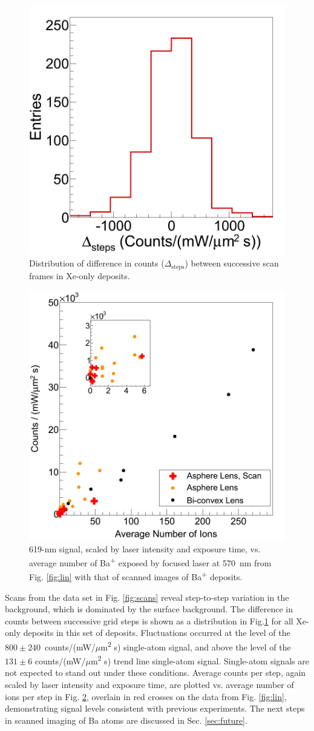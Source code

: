 \begin{figure} %
        \centering
                \includegraphics[width=.35\textwidth]{figures/scans_dframeXe.png}
                \caption{Distribution of difference in counts ($\Delta_{\text{steps}}$) between successive scan frames in Xe-only deposits.}
\label{fig:scanVarXe}
\end{figure}

\begin{figure} %
        \centering
                \includegraphics[width=.45\textwidth]{figures/lin_withScan_lin.png}
                \caption{619-nm signal, scaled by laser intensity and exposure time, vs. average number of Ba\textsuperscript{+} exposed by focused laser at 570~nm from Fig. \ref{fig:lin} with that of scanned images of Ba\textsuperscript{+} deposits.}
\label{fig:linScan}
\end{figure}

Scans from the data set in Fig. \ref{fig:scans} reveal step-to-step variation in the background, which is dominated by the surface background.  The difference in counts between successive grid steps is shown as a distribution in Fig.\ref{fig:scanVarXe} for all Xe-only deposits in this set of deposits.  Fluctuations occurred at the level of the $800 \pm 240$~counts/(mW/$\mu$m\textsuperscript{2} s) single-atom signal, and above the level of the $131 \pm 6$ counts/(mW/$\mu$m\textsuperscript{2} s) trend line single-atom signal.  Single-atom signals are not expected to stand out under these conditions.  Average counts per step, again scaled by laser intensity and exposure time, are plotted vs. average number of ions per step in Fig. \ref{fig:linScan}, overlain in red crosses on the data from Fig. \ref{fig:lin}, demonstrating signal levels consistent with previous experiments.  The next steps in scanned imaging of Ba atoms are discussed in Sec. \ref{sec:future}.


